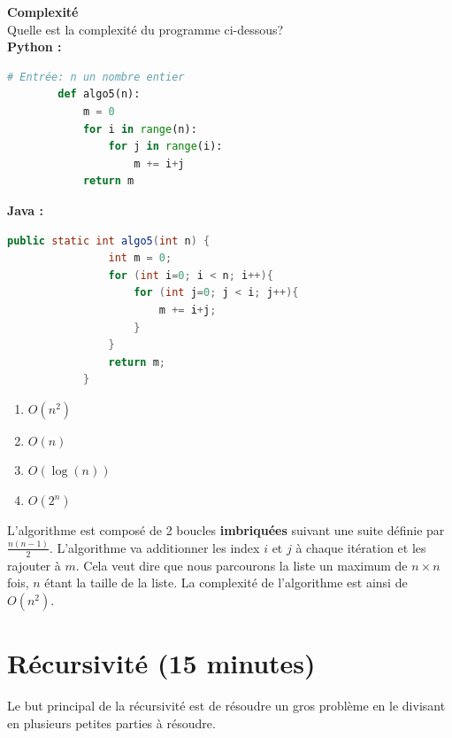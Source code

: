 \newpage

\begin{Exercice}[10 minutes] \textbf{Complexité \optionnel} \\
    Quelle est la complexité du programme ci-dessous?\\
        \textbf{Python :}
        \begin{lstlisting}[language=Python]
        # Entrée: n un nombre entier
        def algo5(n):
            m = 0
            for i in range(n):
                for j in range(i):
                    m += i+j
            return m
        \end{lstlisting}
        
        \textbf{Java :}
        \begin{lstlisting}[language=Java]
            public static int algo5(int n) {
                int m = 0;
                for (int i=0; i < n; i++){
                    for (int j=0; j < i; j++){
                        m += i+j;
                    }
                }
                return m;
            }
        \end{lstlisting}
    
        \begin{enumerate}
            \item $O(n^2)$
            \item $O(n)$
            \item $O(\log(n))$
            \item $O(2^n)$
        \end{enumerate}

    \begin{solution} 
    L'algorithme est composé de 2 boucles \textbf{imbriquées} suivant une suite définie par $\frac{n(n-1)}{2}$. L'algorithme va additionner les index $i$ et $j$ à chaque itération et les rajouter à $m$.
    Cela veut dire que nous parcourons la liste un maximum de $n \times n$ fois, $n$ étant la taille de la liste. La complexité de l'algorithme est ainsi de $O(n^2)$.
    \end{solution}
    
\end{Exercice}
    
        
\section{Récursivité (15 minutes)}

Le but principal de la récursivité est de résoudre un gros problème en le divisant en plusieurs petites parties à résoudre.

